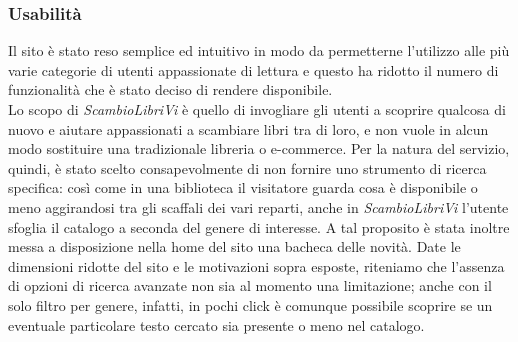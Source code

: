 \documentclass[openany,10pt,a4paper]{article}
\begin{document}
			
		\subsubsection{Usabilità}
		Il sito è stato reso semplice ed intuitivo in modo da permetterne l'utilizzo alle più varie categorie di utenti appassionate di lettura e questo ha ridotto il numero di funzionalità che è stato deciso di rendere disponibile. \\ 
		Lo scopo di \textit{ScambioLibriVi} è quello di invogliare gli utenti a scoprire qualcosa di nuovo e aiutare appassionati a scambiare libri tra di loro, e non vuole in alcun modo sostituire una tradizionale libreria o e-commerce.
		Per la natura del servizio, quindi, è stato scelto consapevolmente di non fornire uno strumento di ricerca specifica: così come in una biblioteca il visitatore guarda cosa è disponibile o meno aggirandosi tra gli scaffali dei vari reparti, anche in \textit{ScambioLibriVi} l'utente sfoglia il catalogo a seconda del genere di interesse. 
			A tal proposito è stata inoltre messa a disposizione nella home del sito una bacheca delle novità.
		Date le dimensioni ridotte del sito e le motivazioni sopra esposte, riteniamo che l'assenza di opzioni di ricerca avanzate non sia al momento una limitazione; anche con il solo filtro per genere, infatti, in pochi click è comunque possibile scoprire se un eventuale particolare testo cercato sia presente o meno nel catalogo.
	
\end{document}
